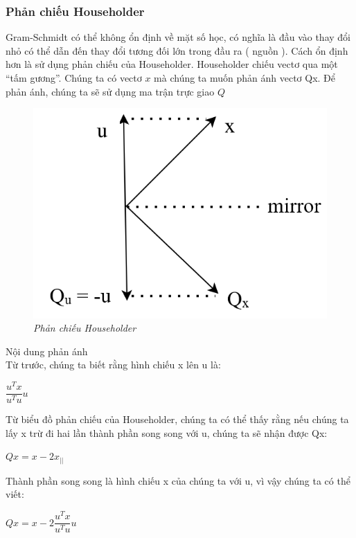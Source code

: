 \subsubsection{Phản chiếu Householder}
Gram-Schmidt có thể không ổn định về mặt số học, có nghĩa là đầu vào thay đổi nhỏ 
có thể dẫn đến thay đổi tương đối lớn trong đầu ra ( nguồn ). Cách ổn định hơn là sử dụng phản chiếu của Householder. Householder chiếu vectơ qua một “tấm gương”. 
Chúng ta có vectơ $x$ mà chúng ta muốn phản ánh vectơ Qx. Để phản ánh, chúng ta sẽ 
sử dụng ma trận trực giao $Q$\\
\begin{figure}[!ht]
	\centering
	\includegraphics[scale=0.27]{mirror}
	\caption{\textit{Phản chiếu Householder}}\label{fig:Picture}
\end{figure}
Nội dung phản ánh\\
Từ trước, chúng ta biết rằng hình chiếu x lên u là:\\
\begin{center}
	$\dfrac{u^{T}x}{u^{T}u}u$
\end{center}
Từ biểu đồ phản chiếu của Householder, chúng ta có thể thấy rằng nếu chúng ta lấy x trừ đi hai lần thành phần song song với u, chúng ta sẽ nhận được Qx:\\
\begin{center}
	$Qx=x-2x_{||}$
\end{center}

Thành phần song song là hình chiếu x của chúng ta với u, vì vậy chúng ta có thể viết:\\

\begin{center}
	$Qx=x-2\dfrac{u^{T}x}{u^{T}u}u$
\end{center}

